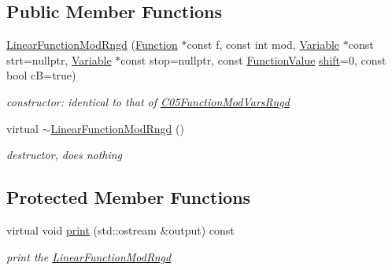 \subsection*{Public Member Functions}
\begin{DoxyCompactItemize}
\item 
\mbox{\label{class_s_m_spp__di__unipi__it_1_1_linear_function_mod_rngd_a359b1735a576d0c90a0c23c1e84431ab}} 
\mbox{\hyperlink{class_s_m_spp__di__unipi__it_1_1_linear_function_mod_rngd_a359b1735a576d0c90a0c23c1e84431ab}{Linear\+Function\+Mod\+Rngd}} (\mbox{\hyperlink{class_s_m_spp__di__unipi__it_1_1_function}{Function}} $\ast$const f, const int mod, \mbox{\hyperlink{class_s_m_spp__di__unipi__it_1_1_variable}{Variable}} $\ast$const strt=nullptr, \mbox{\hyperlink{class_s_m_spp__di__unipi__it_1_1_variable}{Variable}} $\ast$const stop=nullptr, const \mbox{\hyperlink{class_s_m_spp__di__unipi__it_1_1_function_mod_a44f54e31f9fa8a29194218c234876284}{Function\+Value}} \mbox{\hyperlink{class_s_m_spp__di__unipi__it_1_1_function_mod_a177a0111cf0d0fdc5409df06c3b5e282}{shift}}=0, const bool cB=true)
\begin{DoxyCompactList}\small\item\em constructor\+: identical to that of \mbox{\hyperlink{class_s_m_spp__di__unipi__it_1_1_c05_function_mod_vars_rngd}{C05\+Function\+Mod\+Vars\+Rngd}} \end{DoxyCompactList}\item 
\mbox{\label{class_s_m_spp__di__unipi__it_1_1_linear_function_mod_rngd_a5af52bb5e6c71689bd22498f0b3c4c6e}} 
virtual \mbox{\hyperlink{class_s_m_spp__di__unipi__it_1_1_linear_function_mod_rngd_a5af52bb5e6c71689bd22498f0b3c4c6e}{$\sim$\+Linear\+Function\+Mod\+Rngd}} ()
\begin{DoxyCompactList}\small\item\em destructor, does nothing \end{DoxyCompactList}\end{DoxyCompactItemize}
\subsection*{Protected Member Functions}
\begin{DoxyCompactItemize}
\item 
\mbox{\label{class_s_m_spp__di__unipi__it_1_1_linear_function_mod_rngd_a2e7b9c9148a98c5c342e8c25cac95926}} 
virtual void \mbox{\hyperlink{class_s_m_spp__di__unipi__it_1_1_linear_function_mod_rngd_a2e7b9c9148a98c5c342e8c25cac95926}{print}} (std\+::ostream \&output) const
\begin{DoxyCompactList}\small\item\em print the \mbox{\hyperlink{class_s_m_spp__di__unipi__it_1_1_linear_function_mod_rngd}{Linear\+Function\+Mod\+Rngd}} \end{DoxyCompactList}\end{DoxyCompactItemize}
